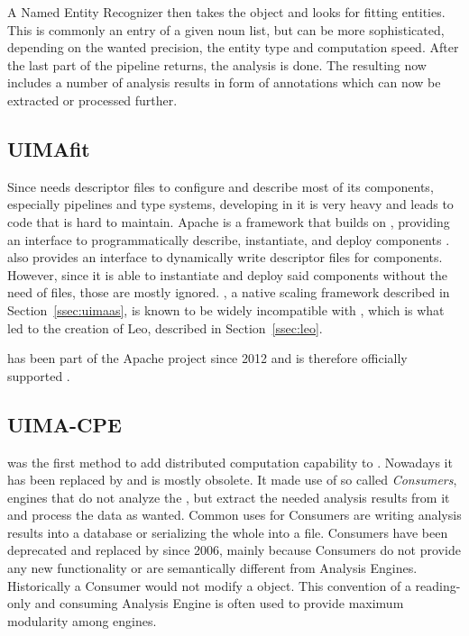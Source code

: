 A Named Entity Recognizer then takes the \cas{} object and looks for fitting entities. This is commonly an entry of a given noun list, but can be more sophisticated, depending on the wanted precision, the entity type and computation speed. After the last part of the pipeline returns, the analysis is done. The resulting \cas{} now includes a number of analysis results in form of annotations which can now be extracted or processed further.

\subsection{UIMAfit}
\label{ssec:uimafit}
Since \uima{} needs \xml{} descriptor files to configure and describe most of its components, especially pipelines and type systems, developing in it is very \xml{} heavy and leads to code that is hard to maintain. Apache \uimafit{} is a framework that builds on \uima{}, providing an interface to programmatically describe, instantiate, and deploy \uima{} components \cite{ogren-bethard:2009:SETQA-NLP}. \uimafit{} also provides an interface to dynamically write \xml{} descriptor files for \uima{} components. However, since it is able to instantiate and deploy said components without the need of \xml{} files, those are mostly ignored. \uimaas{}, a native \uima{} scaling framework described in Section~\ref{ssec:uimaas}, is known to be widely incompatible with \uimafit{}, which is what led to the creation of Leo, described in Section~\ref{ssec:leo}.

\uimafit{} has been part of the Apache \uima{} project since 2012 and is therefore officially supported \cite{github:uimafit}. 



\subsection{UIMA-CPE}
\label{ssec:uimacpe}
\uimacpe{} was the first method to add distributed computation capability to \uima{}. Nowadays it has been replaced by \uimaas{} and is mostly obsolete. It made use of so called \emph{\cas{} Consumers}, engines that do not analyze the \cas{}, but extract the needed analysis results from it and process the data as wanted. Common uses for \cas{} Consumers are writing analysis results into a database or serializing the whole \cas{} into a \xmi{} file. \cas{} Consumers have been deprecated and replaced by \anens{} since 2006, mainly because \cas{} Consumers do not provide any new functionality or are semantically different from Analysis Engines. Historically a \cas{} Consumer would not modify a \cas{} object. This convention of a reading-only and consuming Analysis Engine is often used to provide maximum modularity among \uima{} engines.


